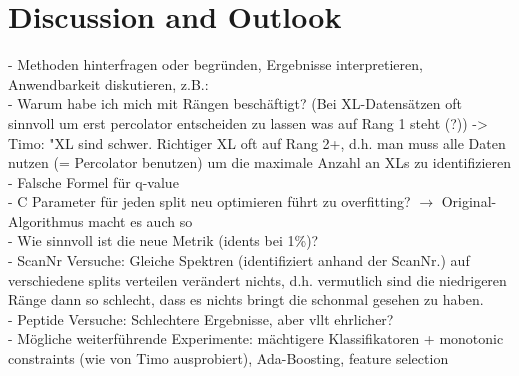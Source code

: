 
\chapter{Discussion and Outlook}
\label{discussion}

- Methoden hinterfragen oder begründen, Ergebnisse interpretieren, Anwendbarkeit diskutieren, z.B.:\\
- Warum habe ich mich mit Rängen beschäftigt? (Bei XL-Datensätzen oft sinnvoll um erst percolator entscheiden zu lassen was auf Rang 1 steht (?)) -> Timo: "XL sind schwer. Richtiger XL oft auf Rang 2+, d.h. man muss alle Daten nutzen (= Percolator benutzen) um die maximale Anzahl an XLs zu identifizieren\\
- Falsche Formel für q-value\\
- C Parameter für jeden split neu optimieren führt zu overfitting? $\rightarrow$ Original-Algorithmus macht es auch so\\
- Wie sinnvoll ist die neue Metrik (idents bei 1\%)?\\
- ScanNr Versuche: Gleiche Spektren (identifiziert anhand der ScanNr.) auf verschiedene splits verteilen verändert nichts, d.h. vermutlich sind die niedrigeren Ränge dann so schlecht, dass es nichts bringt die schonmal gesehen zu haben.\\
- Peptide Versuche: Schlechtere Ergebnisse, aber vllt ehrlicher?\\
- Mögliche weiterführende Experimente: mächtigere Klassifikatoren + monotonic constraints (wie von Timo ausprobiert), Ada-Boosting, feature selection
